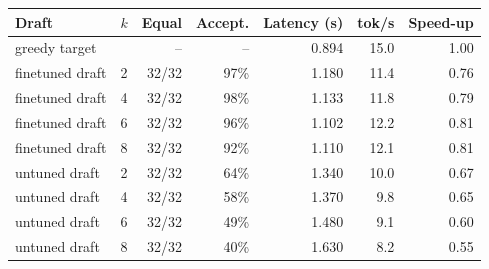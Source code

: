 \begin{tabular}{llrrrrr}\toprule
Draft & $k$ & Equal & Accept. & Latency (s) & tok/s & Speed-up \\\midrule
\multicolumn{2}{l}{greedy target} & -- & -- & 0.894 & 15.0 & 1.00 \\\midrule
finetuned draft & 2 & 32/32 & 97\% & 1.180 & 11.4 & 0.76 \\
finetuned draft & 4 & 32/32 & 98\% & 1.133 & 11.8 & 0.79 \\
finetuned draft & 6 & 32/32 & 96\% & 1.102 & 12.2 & 0.81 \\
finetuned draft & 8 & 32/32 & 92\% & 1.110 & 12.1 & 0.81 \\
untuned draft & 2 & 32/32 & 64\% & 1.340 & 10.0 & 0.67 \\
untuned draft & 4 & 32/32 & 58\% & 1.370 & 9.8 & 0.65 \\
untuned draft & 6 & 32/32 & 49\% & 1.480 & 9.1 & 0.60 \\
untuned draft & 8 & 32/32 & 40\% & 1.630 & 8.2 & 0.55 \\
\bottomrule\end{tabular}
